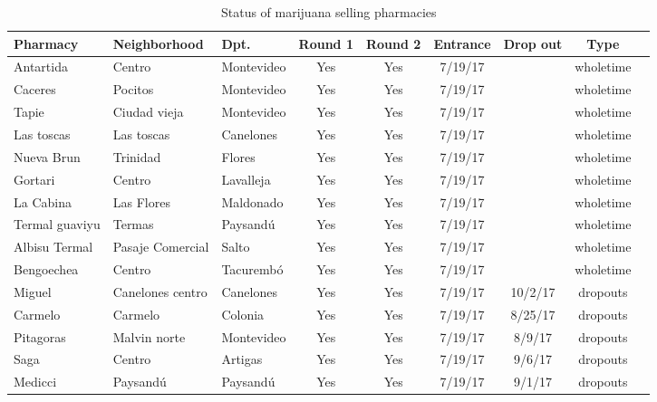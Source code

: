 \documentclass[11pt]{article}
\begin{document}
\begin{small}
\begin{table}[htbp!]
\scriptsize
    \centering
     \caption{Status of  marijuana selling pharmacies}
    \label{tab:pharmsalestatus}
    \begin{tabular}{@{}lllcccccc@{}}
\textbf{Pharmacy}	&	\textbf{Neighborhood}	&	\textbf{Dpt.}	&	\textbf{Round 1}	&	\textbf{Round 2}	&	\textbf{Entrance}	&	\textbf{Drop out}	&	\textbf{Type}	\\
\midrule
Antartida	 	&	 	Centro	 	&	 	Montevideo	 	&	 	Yes	 	&	 	Yes	 	&	 	7/19/17	 	&	 		 	&	 	wholetime	\\
 Caceres 	 	&	 	Pocitos	 	&	 	Montevideo	 	&	 	Yes	 	&	 	Yes	 	&	 	7/19/17	 	&	 		 	&	 	wholetime	\\
 Tapie	 	&	 	Ciudad vieja	 	&	 	Montevideo	 	&	 	Yes	 	&	 	Yes	 	&	 	7/19/17	 	&	 		 	&	 	wholetime	\\
 Las toscas	 	&	 	Las toscas	 	&	 	Canelones	 	&	 	Yes	 	&	 	Yes	 	&	 	7/19/17	 	&	 		 	&	 	wholetime	\\
 Nueva Brun	 	&	 	Trinidad	 	&	 	Flores	 	&	 	Yes	 	&	 	Yes	 	&	 	7/19/17	 	&	 		 	&	 	wholetime	\\
 Gortari	 	&	 	Centro	 	&	 	Lavalleja	 	&	 	Yes	 	&	 	Yes	 	&	 	7/19/17	 	&	 		 	&	 	wholetime	\\
 La Cabina	 	&	 	Las Flores	 	&	 	Maldonado	 	&	 	Yes	 	&	 	Yes	 	&	 	7/19/17	 	&	 		 	&	 	wholetime	\\
 Termal guaviyu	 	&	 	Termas	 	&	 	Paysandú	 	&	 	Yes	 	&	 	Yes	 	&	 	7/19/17	 	&	 		 	&	 	wholetime	\\
 Albisu Termal	 	&	 	Pasaje Comercial	 	&	 	Salto	 	&	 	Yes	 	&	 	Yes	 	&	 	7/19/17	 	&	 		 	&	 	wholetime	\\
 Bengoechea	 	&	 	Centro	 	&	 	Tacurembó	 	&	 	Yes	 	&	 	Yes	 	&	 	7/19/17	 	&	 		 	&	 	wholetime	\\
 Miguel	 	&	 	Canelones centro	 	&	 	Canelones	 	&	 	Yes	 	&	 	Yes	 	&	 	7/19/17	 	&	 	10/2/17	 	&	 	dropouts	\\
 Carmelo	 	&	 	Carmelo	 	&	 	Colonia	 	&	 	Yes	 	&	 	Yes	 	&	 	7/19/17	 	&	 	8/25/17	 	&	 	dropouts	\\
 Pitagoras	 	&	 	Malvin norte	 	&	 	Montevideo	 	&	 	Yes	 	&	 	Yes	 	&	 	7/19/17	 	&	 	8/9/17	 	&	 	dropouts	\\
 Saga	 	&	 	Centro	 	&	 	Artigas	 	&	 	Yes	 	&	 	Yes	 	&	 	7/19/17	 	&	 	9/6/17	 	&	 	dropouts	\\
 Medicci	 	&	 	Paysandú	 	&	 	Paysandú	 	&	 	Yes	 	&	 	Yes	 	&	 	7/19/17	 	&	 	9/1/17	 	&	 	dropouts	\\

\end{tabular}
\end{table}
\end{small}
\end{document}
